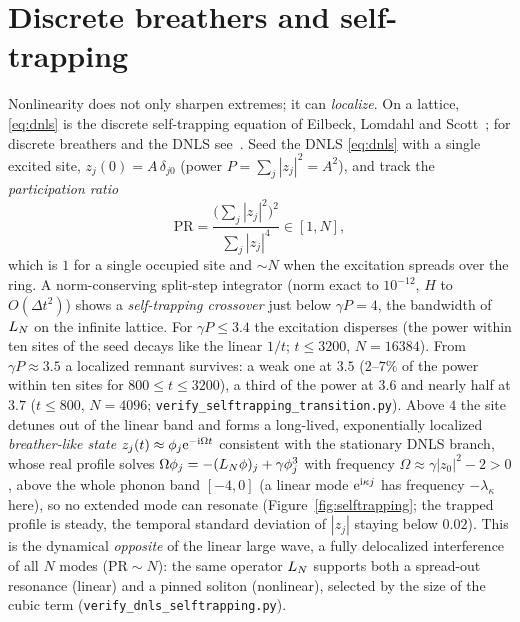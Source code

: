 \section{Discrete breathers and self-trapping}\label{sec:breather}

Nonlinearity does not only sharpen extremes; it can \emph{localize}. On a lattice, \eqref{eq:dnls} is the
discrete self-trapping equation of Eilbeck, Lomdahl and Scott~\cite{ELS85}; for discrete breathers and the
DNLS see~\cite{FlachGorbach08,Kevrekidis09}. Seed the DNLS \eqref{eq:dnls} with a
single excited site, $z_j(0)=A\,\delta_{j0}$ (power $P=\sum_j|z_j|^2=A^2$), and track the
\emph{participation ratio}
\begin{equation}\label{eq:pr}
  \mathrm{PR}=\frac{\bigl(\sum_j|z_j|^2\bigr)^2}{\sum_j|z_j|^4}\in[1,N],
\end{equation}
which is $1$ for a single occupied site and $\sim N$ when the excitation spreads over the ring. A
norm-conserving split-step integrator (norm exact to $10^{-12}$, $H$ to $O(\Delta t^2)$) shows a
\emph{self-trapping crossover} just below $\gamma P=4$, the bandwidth of $L_N$ on the infinite lattice. For
$\gamma P\le3.4$ the excitation disperses (the power within ten sites of the seed decays like the linear
$1/t$; $t\le3200$, $N=16384$). From $\gamma P\approx3.5$ a localized remnant survives: a weak one at $3.5$
($2$--$7\%$ of the power within ten sites for $800\le t\le3200$), a third of the power at $3.6$ and nearly half
at $3.7$ ($t\le800$, $N=4096$; \texttt{verify\_selftrapping\_transition.py}). Above $4$ the site detunes out of the linear band and
forms a long-lived, exponentially localized \emph{breather-like state} $z_j(t)\approx\phi_j\mathrm{e}^{-\mathrm i\Omega t}$
consistent with the stationary DNLS branch, whose real profile solves $\Omega\phi_j=-(L_N\phi)_j+\gamma\phi_j^3$
with frequency $\Omega\approx\gamma|z_0|^2-2>0$, above the whole phonon band $[-4,0]$ (a linear mode
$\mathrm{e}^{\mathrm i\kappa j}$ has frequency $-\lambda_\kappa$ here), so no extended mode can resonate
(Figure~\ref{fig:selftrapping}; the trapped profile is steady, the temporal standard deviation of $|z_j|$
staying below $0.02$). This is the dynamical \emph{opposite} of the linear large wave, a fully delocalized
interference of all $N$ modes ($\mathrm{PR}\sim N$):
the same operator $L_N$ supports both a spread-out resonance (linear) and a pinned soliton (nonlinear),
selected by the size of the cubic term (\texttt{verify\_dnls\_selftrapping.py}).

